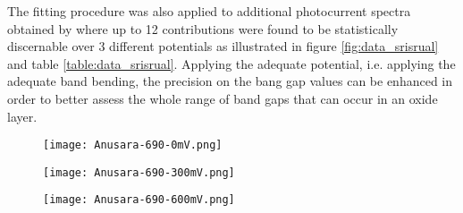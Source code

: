 The fitting procedure was also applied to additional photocurrent spectra 
obtained by \citet{srisrual2013} where up to 12 contributions were found to 
be statistically discernable over 3 different potentials as illustrated in 
figure \ref{fig:data_srisrual} and table \ref{table:data_srisrual}.
Applying the adequate potential, i.e. applying the adequate band bending,
the precision on the bang gap values can be enhanced in order to better
assess the whole range of band gaps that can occur in an oxide layer.

\renewcommand{\coef}{0.4}
\begin{figure*}[htb]
	\centering
	\begin{subfigure}{\coef\textwidth}
		\centering
	 	\texttt{[image: Anusara-690-0mV.png]}
	 	\caption{}
	 	\label{fig:data_srisrual1}
	\end{subfigure}
	\begin{subfigure}{\coef\textwidth}
		\centering
	 	\texttt{[image: Anusara-690-300mV.png]}
	 	\caption{}
	 	\label{fig:data_srisrual2}
	\end{subfigure}

	\begin{subfigure}{\coef\textwidth}
		\centering
	 	\texttt{[image: Anusara-690-600mV.png]}
	 	\caption{}
	 	\label{fig:data_srisrual3}
	\end{subfigure}
	
	\caption{Energy photocurrent spectra recorded at different applied potentials 
    on a Ni-based alloy A600 oxidized at 900°C in oxygen for 2h (according to \citep{srisrual2013}).}
	\label{fig:data_srisrual}
\end{figure*}

